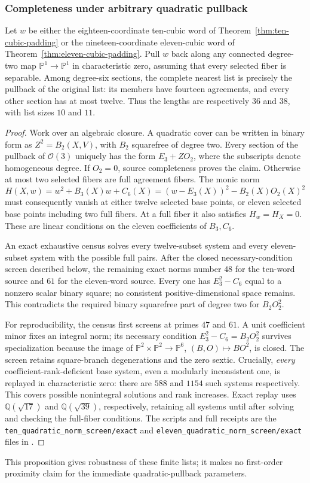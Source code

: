 \subsubsection{Completeness under arbitrary quadratic pullback}
\begin{proposition}\label{prop:padded-quadratic-completeness}
Let $w$ be either the eighteen-coordinate ten-cubic word of
Theorem~\ref{thm:ten-cubic-padding} or the nineteen-coordinate eleven-cubic
word of Theorem~\ref{thm:eleven-cubic-padding}.  Pull $w$ back along any
connected degree-two map $\mathbb P^1\to\mathbb P^1$ in characteristic zero,
assuming that every selected fiber is separable.  Among degree-six sections,
the complete nearest list is precisely the pullback of the original list:
its members have fourteen agreements, and every other section has at most
twelve.  Thus the lengths are respectively $36$ and $38$, with list sizes
$10$ and $11$.
\end{proposition}
\begin{proof}
Work over an algebraic closure.  A quadratic cover can be written in binary
form as $Z^2=B_2(X,V)$, with $B_2$ squarefree of degree two.  Every section of
the pullback of $\mathcal O(3)$ uniquely has the form $E_3+ZO_2$, where the
subscripts denote homogeneous degree.  If $O_2=0$, source completeness proves
the claim.  Otherwise at most two selected fibers are full agreement fibers.
The monic norm
\[
 H(X,w)=w^2+B_3(X)w+C_6(X)
       =(w-E_3(X))^2-B_2(X)O_2(X)^2
\]
must consequently vanish at either twelve selected base points, or eleven
selected base points including two full fibers.  At a full fiber it also
satisfies $H_w=H_X=0$.  These are linear conditions on the eleven coefficients
of $B_3,C_6$.

An exact exhaustive census solves every twelve-subset system and every
eleven-subset system with the possible full pairs.  After the closed necessary-condition screen described below, the remaining
exact norms number $48$ for the ten-word source and $61$ for the eleven-word source.
Every one has $E_3^2-C_6$ equal to a nonzero scalar binary square; no consistent
positive-dimensional space remains.  This contradicts the required binary
squarefree part of degree two for $B_2O_2^2$.

For reproducibility, the census first screens at primes $47$ and $61$.
A unit coefficient minor fixes an integral norm; its necessary condition
$E_3^2-C_6=B_2O_2^2$ survives specialization because the image of
$\mathbb P^2\times\mathbb P^2\to\mathbb P^6$, $(B,O)\mapsto BO^2$, is closed.
The screen retains square-branch degenerations and the zero sextic.
Crucially, \emph{every} coefficient-rank-deficient base system, even a
modularly inconsistent one, is replayed in characteristic zero: there are
$588$ and $1154$ such systems respectively.  This covers possible nonintegral
solutions and rank increases.  Exact replay uses
$\mathbb Q(\sqrt{17})$ and $\mathbb Q(\sqrt{39})$, respectively, retaining all
systems until after solving and checking the full-fiber conditions.
The scripts and full receipts are the
\texttt{ten\_quadratic\_norm\_screen/exact} and
\texttt{eleven\_quadratic\_norm\_screen/exact} files in
.
\end{proof}
This proposition gives robustness of these finite lists; it makes no
first-order proximity claim for the immediate quadratic-pullback parameters.
